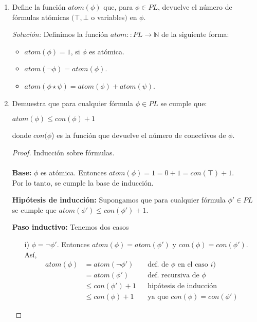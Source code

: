 \documentclass[letterpaper,12pt]{article}
\begin{document}
\begin{enumerate}
    \newpage
    \item Define la función $atom(\phi)$ que, para $\phi \in PL$, devuelve el 
    número de fórmulas atómicas $(\top, \bot$ o variables$)$ en $\phi$.
    
    \textit{Solución:} Definimos la función $atom :: PL \rightarrow \mathbb{N}$
    de la siguiente forma:
    \begin{itemize}
        \item $atom(\phi) = 1$, si $\phi$ es atómica.
        \item $atom(\neg \phi) = atom(\phi)$. 
        \item $atom(\phi \star \psi) = atom(\phi) + atom(\psi)$.
    \end{itemize}

    \item Demuestra que para cualquier fórmula $\phi \in PL$ se cumple que:
    \begin{center}
        $atom(\phi) \leq con(\phi) + 1$
    \end{center}
    donde $con(\phi$) es la función que devuelve el número de conectivos de 
    $\phi$.

    \begin{proof}
        Inducción sobre fórmulas. \\ \\
        \textbf{Base:} $\phi$ es atómica. Entonces 
        $atom(\phi) = 1 = 0 + 1 = con(\top) + 1$.\\
        Por lo tanto, se cumple la base de inducción.

        \textbf{Hipótesis de inducción:} Supongamos que para cualquier fórmula
        $\phi' \in PL$ se cumple que $atom(\phi') \leq con(\phi') + 1$.

        \textbf{Paso inductivo:} Tenemos dos casos
        \begin{itemize}
            \item[i)] $\phi = \neg \phi'$. Entonces 
            $atom(\phi) = atom(\phi')$ y $con(\phi) = con(\phi')$. Así, 
            \begin{align*}
                atom(\phi) &= atom(\neg \phi')
                           && \text{def. de $\phi$ en el caso $i$)} \\
                           &= atom(\phi')
                           && \text{def. recursiva de $\phi$} \\
                           &\leq con(\phi') + 1
                           && \text{hipótesis de inducción} \\
                           &\leq con(\phi) + 1
                           && \text{ya que $con(\phi) = con(\phi')$}
            \end{align*} 


\end{itemize}
\end{proof}
\end{enumerate}
\end{document}
